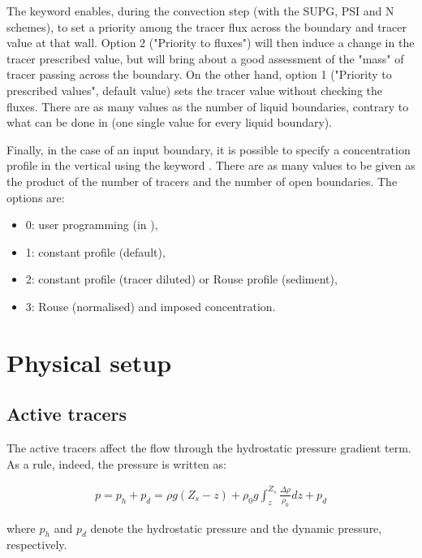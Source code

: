 The keyword  enables,
during the convection step (with the SUPG, PSI and N schemes), to set a
priority among the tracer flux across the boundary and tracer value at that wall.
Option 2 ("Priority to fluxes") will then induce a change in the tracer
prescribed value, but will bring about a good assessment of the "mass" of tracer
passing across the boundary.
On the other hand, option 1 ("Priority to prescribed values", default value)
sets the tracer value without checking the fluxes.
There are as many values as the number of liquid boundaries, contrary to
what can be done in  (one single value for every liquid boundary).

Finally, in the case of an input boundary, it is possible to specify a
concentration profile in the vertical using the keyword .
There are as many values to be given as the product of the number of tracers
and the number of open boundaries.
The options are:

\begin{itemize}
\item 0: user programming (in ),

\item 1: constant profile (default),

\item 2: constant profile (tracer diluted) or Rouse profile (sediment),

\item 3: Rouse (normalised) and imposed concentration.
\end{itemize}

\section{Physical setup}

\subsection{Active tracers}

The active tracers affect the flow through the hydrostatic pressure gradient
term. As a rule, indeed, the pressure is written as:

\begin{align}
p=p_{h} +p_{d} =\rho g(Z_{s} -z)+\rho _{0} g\int _{z}^{Z_{s} }\frac{\Delta \rho
}{\rho _{0} }  dz+p_{d}
\end{align}

where $p_{h} $ and $p_{d} $ denote the hydrostatic pressure and the dynamic
pressure, respectively.

